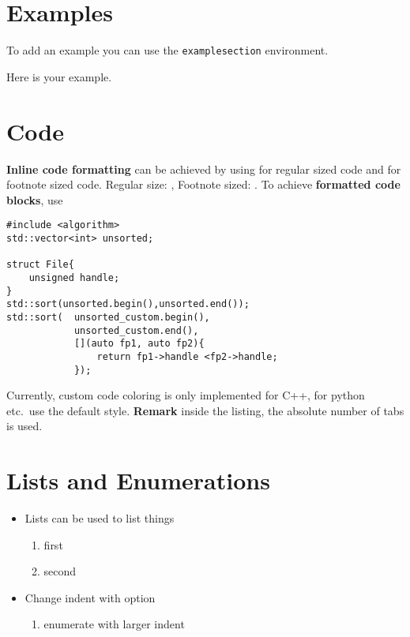 \documentclass[\fontheight]{extarticle}
\begin{document}
\begin{multicols*}{3}
    \section{Examples}
    To add an example you can use the \texttt{examplesection} environment.
    \begin{examplesection}
        Here is your example.
    \end{examplesection}

    \section{Code}
    \textbf{Inline code formatting} can be achieved by using  for regular sized code
    and  for footnote sized code.\newline
    Regular size: ,\newline
    Footnote sized: .
    \newpar{}
    To achieve \textbf{formatted code blocks}, use \newline

    \begin{lstlisting}[style=bright_C++]
#include <algorithm>
std::vector<int> unsorted;

struct File{
    unsigned handle;
}
std::sort(unsorted.begin(),unsorted.end());
std::sort(  unsorted_custom.begin(),
            unsorted_custom.end(),
            [](auto fp1, auto fp2){
                return fp1->handle <fp2->handle;
            });
\end{lstlisting}

    Currently, custom code coloring is only implemented for C++, for python etc.\ use the default style.
    \newpar{}
    \textbf{Remark} inside the listing, the absolute number of tabs is used.

    \section{Lists and Enumerations}
    \begin{itemize}
        \item Lists can be used to list things
              \begin{enumerate}
                  \item first
                  \item second
              \end{enumerate}
        \item Change indent with option \code{[leftmargin = 40pt]}
              \begin{enumerate}[leftmargin=40pt]
                  \item enumerate with larger indent
              \end{enumerate}
    \end{itemize}


\end{multicols*}
\end{document}
